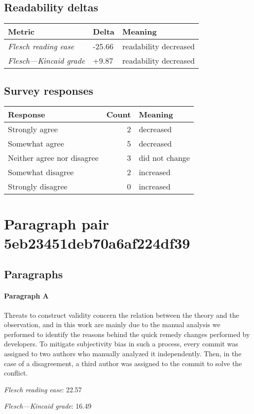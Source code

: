 \subsection{Readability deltas}

\begin{tabular}{lll}
\toprule
               \textbf{Metric} & \textbf{Delta} &       \textbf{Meaning} \\
\midrule
    \emph{Flesch reading ease} &         -25.66 &  readability decreased \\
 \emph{Flesch---Kincaid grade} &          +9.87 &  readability decreased \\
\bottomrule
\end{tabular}

\subsection{Survey responses}
\begin{tabular}{lrl}
\toprule
          \textbf{Response} &  \textbf{Count} & \textbf{Meaning} \\
\midrule
             Strongly agree &               2 &        decreased \\
             Somewhat agree &               5 &        decreased \\
 Neither agree nor disagree &               3 &   did not change \\
          Somewhat disagree &               2 &        increased \\
          Strongly disagree &               0 &        increased \\
\bottomrule
\end{tabular}

\section{Paragraph pair 5eb23451deb70a6af224df39}
\subsection{Paragraphs}
\paragraph{Paragraph A}
Threats to construct validity concern the relation between the theory and the observation, and in this work are mainly due to the manual analysis we performed to identify the reasons behind the quick remedy changes performed by developers. To mitigate subjectivity bias in such a process, every commit was assigned to two authors who manually analyzed it independently. Then, in the case of a disagreement, a third author was assigned to the commit to solve the conflict.\par\medskip
\emph{Flesch reading ease}: 22.57\par
\emph{Flesch---Kincaid grade}: 16.49

